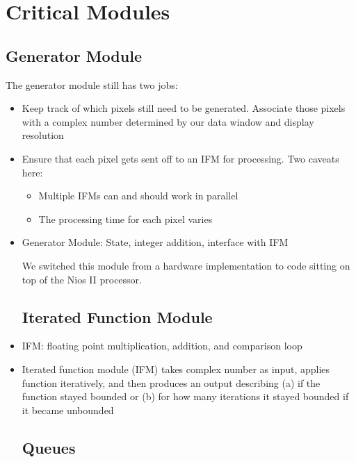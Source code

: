 \documentclass{article}
\begin{document}
\section{Critical Modules}

\subsection{Generator Module}
The generator module still has two jobs:
\begin{itemize}
\item Keep track of which pixels still need to be
  generated. Associate those pixels with a complex number determined
  by our data window and display resolution
\item Ensure that each pixel gets sent off to an IFM for
  processing. Two caveats here:
  \begin{itemize}
  \item Multiple IFMs can and should work in parallel
  \item The processing time for each pixel varies
  \end{itemize}

\item Generator Module: State, integer addition, interface with IFM

We switched this module from a hardware implementation to code sitting
on top of the Nios II processor.

\subsection{Iterated Function Module}

\item IFM: floating point multiplication, addition, and comparison loop

\item Iterated function module (IFM) takes complex number as input,
  applies function iteratively, and then produces an output describing
  (a) if the function stayed bounded or (b) for how many iterations it
  stayed bounded if it became unbounded

\subsection{Queues}




\end{itemize}
\end{document}

